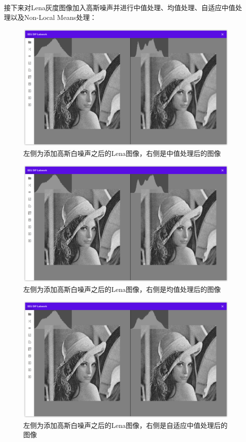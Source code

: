 \documentclass{article}
\begin{document}
接下来对Lena灰度图像加入高斯噪声并进行中值处理、均值处理、自适应中值处理以及Non-Local Means处理：

\begin{figure}[H]
    \includegraphics[width=\textwidth]{img/gaussian/lena-med.png}
    \caption{左侧为添加高斯白噪声之后的Lena图像，右侧是中值处理后的图像}
\end{figure}

\begin{figure}[H]
    \includegraphics[width=\textwidth]{img/gaussian/lena-avg.png}
    \caption{左侧为添加高斯白噪声之后的Lena图像，右侧是均值处理后的图像}
\end{figure}

\begin{figure}[H]
    \includegraphics[width=\textwidth]{img/gaussian/lena-adaptive.png}
    \caption{左侧为添加高斯白噪声之后的Lena图像，右侧是自适应中值处理后的图像}
\end{figure}
\end{document}
